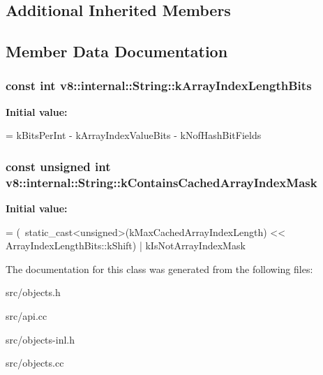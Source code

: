 \subsection*{Additional Inherited Members}


\subsection{Member Data Documentation}
\hypertarget{classv8_1_1internal_1_1_string_a40f3f35fdb15a8ec4fba2a0ca72a6342}{}
\subsubsection[{k\+Array\+Index\+Length\+Bits}]{\setlength{\rightskip}{0pt plus 5cm}const int v8\+::internal\+::\+String\+::k\+Array\+Index\+Length\+Bits\hspace{0.3cm}{\ttfamily [static]}}\label{classv8_1_1internal_1_1_string_a40f3f35fdb15a8ec4fba2a0ca72a6342}
{\bfseries Initial value\+:}
\begin{DoxyCode}
=
      kBitsPerInt - kArrayIndexValueBits - kNofHashBitFields
\end{DoxyCode}
\hypertarget{classv8_1_1internal_1_1_string_a10ac689de027a97f85ec6034e390cb04}{}
\subsubsection[{k\+Contains\+Cached\+Array\+Index\+Mask}]{\setlength{\rightskip}{0pt plus 5cm}const unsigned int v8\+::internal\+::\+String\+::k\+Contains\+Cached\+Array\+Index\+Mask\hspace{0.3cm}{\ttfamily [static]}}\label{classv8_1_1internal_1_1_string_a10ac689de027a97f85ec6034e390cb04}
{\bfseries Initial value\+:}
\begin{DoxyCode}
=
      (~static\_cast<\textcolor{keywordtype}{unsigned}>(kMaxCachedArrayIndexLength)
       << ArrayIndexLengthBits::kShift) |
      kIsNotArrayIndexMask
\end{DoxyCode}


The documentation for this class was generated from the following files\+:\begin{DoxyCompactItemize}
\item 
src/objects.\+h\item 
src/api.\+cc\item 
src/objects-\/inl.\+h\item 
src/objects.\+cc\end{DoxyCompactItemize}
